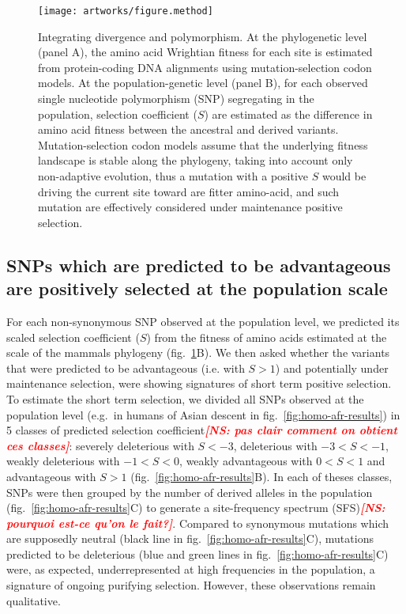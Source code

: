 \documentclass{article}
\newcommand{\NS}[1]{\textcolor{red}{\textbf{\emph{[NS: #1]}}}}
\newcommand{\Sphy}{S}
\newcommand{\divStrongDel}{\Sphy < -3}
\newcommand{\divDel}{-3 < \Sphy < -1}
\newcommand{\divWeakDel}{-1 < \Sphy < 0}
\newcommand{\divWeakAdv}{0 < \Sphy < 1}
\newcommand{\divAdv}{ \Sphy > 1}
\begin{document}
    \begin{figure}[!ht]
        \centering
        \texttt{[image: artworks/figure.method]}
        \caption{
            Integrating divergence and polymorphism.
            At the phylogenetic level (panel A), the amino acid Wrightian fitness for each site is estimated from protein-coding DNA alignments using mutation-selection codon models.
            At the population-genetic level (panel B), for each observed single nucleotide polymorphism (SNP) segregating in the population, selection coefficient ($\Sphy$) are estimated as the difference in amino acid fitness between the ancestral and derived variants.
            Mutation-selection codon models assume that the underlying fitness landscape is stable along the phylogeny, taking into account only non-adaptive evolution, thus a mutation with a positive $\Sphy$ would be driving the current site toward are fitter amino-acid, and such mutation are effectively considered under maintenance positive selection.
        }
        \label{fig:method}
    \end{figure}



    \subsection*{SNPs which are predicted to be advantageous are positively selected at the population scale}

    For each non-synonymous SNP observed at the population level, we predicted its scaled selection coefficient ($\Sphy$) from the fitness of amino acids estimated at the scale of the mammals phylogeny (fig.~\ref{fig:method}B).
    We then asked whether the variants that were predicted to be advantageous (i.e. with $\Sphy > 1$) and potentially under maintenance selection, were showing signatures of short term positive selection.
    To estimate the short term selection, we divided all SNPs observed at the population level (e.g.~in humans of Asian descent in fig.~\ref{fig:homo-afr-results}) in 5 classes of predicted selection coefficient\NS{pas clair comment on obtient ces classes}: severely deleterious with $\divStrongDel$, deleterious with $\divDel$, weakly deleterious with $\divWeakDel$, weakly advantageous with $\divWeakAdv$ and advantageous with $\divAdv$ (fig.~\ref{fig:homo-afr-results}B).
    In each of theses classes, SNPs were then grouped by the number of derived alleles in the population (fig.~\ref{fig:homo-afr-results}C) to generate a site-frequency spectrum (SFS)\NS{pourquoi est-ce qu'on le fait?}.
    Compared to synonymous mutations which are supposedly neutral (black line in fig.~\ref{fig:homo-afr-results}C), mutations predicted to be deleterious (blue and green lines in fig.~\ref{fig:homo-afr-results}C) were, as expected, underrepresented at high frequencies in the population, a signature of ongoing purifying selection.
    However, these observations remain qualitative.
\end{document}
